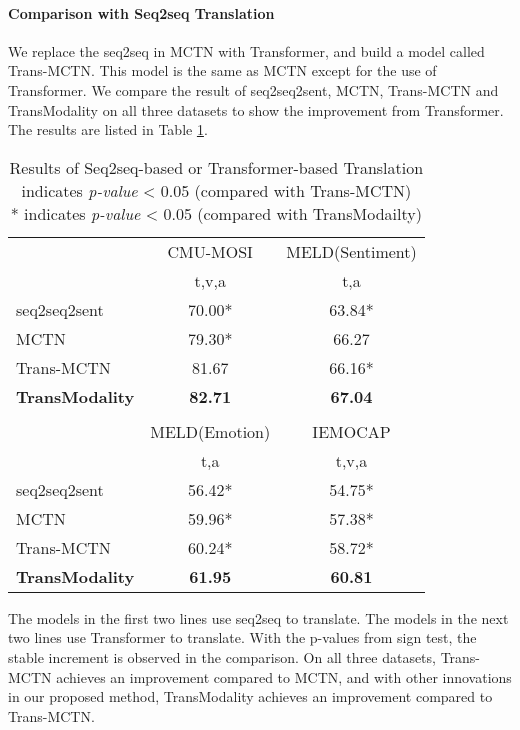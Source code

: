 \documentclass[sigconf]{acmart}
\begin{document}
	\paragraph{Comparison with Seq2seq Translation}
	We replace the seq2seq in MCTN \cite{pham2018found} with Transformer, and build a model called Trans-MCTN. This model is the same as MCTN except for the use of Transformer. We compare the result of seq2seq2sent, MCTN, Trans-MCTN and TransModality on all three datasets to show the improvement from Transformer. The results are listed in Table \ref{tab:head2head}.
	\begin{table}[htbp]
		\centering
		\caption{Results of Seq2seq-based or Transformer-based Translation \\  indicates \textit{p-value} < 0.05 (compared with Trans-MCTN) \\ * indicates \textit{p-value} < 0.05 (compared with TransModailty)}
		\begin{tabular}{|l|c|c|}
		\hline
		\multirow{2}[4]{*}{} & CMU-MOSI & MELD(Sentiment) \\
	\cline{2-3}          & t,v,a & t,a \\
		\hline
		\hline
		seq2seq2sent & 70.00* & 63.84* \\
		MCTN  & 79.30* & 66.27 \\
		\hline
		Trans-MCTN & 81.67 & 66.16* \\
		\hline
		\textbf{TransModality} & \textbf{82.71} & \textbf{67.04} \\
		\hline
		\multicolumn{1}{l}{} & \multicolumn{1}{c}{} & \multicolumn{1}{c}{} \\
		\hline
		\multirow{2}[4]{*}{} & MELD(Emotion) & IEMOCAP \\
	\cline{2-3}          & t,a   & t,v,a \\
		\hline
		\hline
		seq2seq2sent & 56.42* & 54.75* \\
		MCTN  & 59.96* & 57.38* \\
		\hline
		Trans-MCTN & 60.24* & 58.72* \\
		\hline
		\textbf{TransModality} & \textbf{61.95} & \textbf{60.81} \\
		\hline
		\end{tabular}\label{tab:head2head}\end{table}The models in the first two lines use seq2seq to translate. The models in the next two lines use Transformer to translate. With the p-values from sign test, the stable increment is observed in the comparison. On all three datasets, Trans-MCTN achieves an improvement compared to MCTN, and with other innovations in our proposed method, TransModality achieves an improvement compared to Trans-MCTN. 
	
\end{document}

